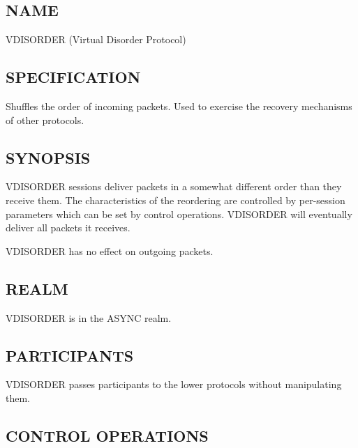 %     
%
%
%
%
%

\subsection*{NAME}

\noindent VDISORDER (Virtual Disorder Protocol)

\subsection*{SPECIFICATION}

\noindent 
Shuffles the order of incoming packets.  Used to exercise the
recovery mechanisms of other protocols.

\subsection*{SYNOPSIS}

\noindent 
VDISORDER sessions deliver packets in a somewhat different order than
they receive them.  The characteristics of the reordering are 
controlled by per-session parameters which can be set by
control operations.  VDISORDER will eventually deliver all packets it
receives.  

VDISORDER has no effect on outgoing packets.

 
\subsection*{REALM}

VDISORDER is in the ASYNC realm.

\subsection*{PARTICIPANTS}

VDISORDER passes participants to the lower protocols without manipulating
them. 

\subsection*{CONTROL OPERATIONS}


